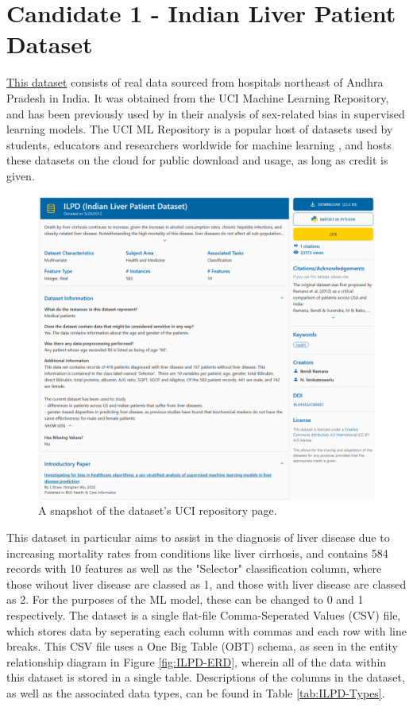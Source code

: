 \documentclass[12pt]{report}
\begin{document}
\section{Candidate 1 - Indian Liver Patient Dataset}
\href{https://archive.ics.uci.edu/dataset/225}{This dataset} \autocite{bendi_ramana_ilpd_2022} consists of real data sourced from hospitals northeast of Andhra Pradesh in India. It was obtained from the
UCI Machine Learning Repository, and has been previously used by \textcite{straw_investigating_2022} in their analysis of sex-related bias in supervised learning models. The UCI ML Repository is a popular host of datasets used by students, 
educators and researchers worldwide for machine learning \autocite{uci_machine_learning_repository_about_nodate}, and hosts these datasets 
on the cloud for public download and usage, as long as credit is given.

\begin{figure}[H]
    \centering
    \includegraphics[width=.75\linewidth]{ILPD-UCI.png}
    \caption{A snapshot of the dataset's UCI repository page.}
    \label{fig:ILPD-UCI}
\end{figure}

This dataset in particular aims to assist in the diagnosis of liver
disease due to increasing mortality rates from conditions like liver cirrhosis, and contains 584 records with 10 features
as well as the "Selector" classification column, where those wihout liver disease are classed as 1, and those with liver disease 
are classed as 2. For the purposes of the ML model, these can be changed to 0 and 1 respectively. 
The dataset is a single flat-file Comma-Seperated Values (CSV) file, which stores data by seperating each column with commas
and each row with line breaks. This CSV file uses a One Big Table (OBT) schema, as seen in the entity relationship diagram 
in Figure \ref{fig:ILPD-ERD}, wherein all of the data within this dataset is stored in a single table. %
Descriptions of the columns in the dataset, as well as the associated data types, can be found in Table \ref{tab:ILPD-Types}.
\end{document}
